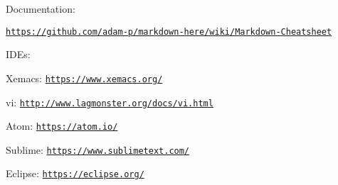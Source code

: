 Documentation\+:
\begin{DoxyItemize}
\item \href{https://github.com/adam-p/markdown-here/wiki/Markdown-Cheatsheet}{\tt https\+://github.\+com/adam-\/p/markdown-\/here/wiki/\+Markdown-\/\+Cheatsheet}
\end{DoxyItemize}

I\+D\+Es\+:
\begin{DoxyItemize}
\item Xemacs\+: \href{https://www.xemacs.org/}{\tt https\+://www.\+xemacs.\+org/}
\item vi\+: \href{http://www.lagmonster.org/docs/vi.html}{\tt http\+://www.\+lagmonster.\+org/docs/vi.\+html}
\item Atom\+: \href{https://atom.io/}{\tt https\+://atom.\+io/}
\item Sublime\+: \href{https://www.sublimetext.com/}{\tt https\+://www.\+sublimetext.\+com/}
\item Eclipse\+: \href{https://eclipse.org/}{\tt https\+://eclipse.\+org/} 
\end{DoxyItemize}